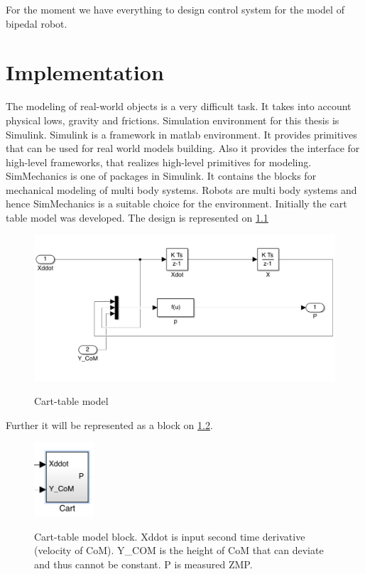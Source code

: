 \documentclass[12pt,a4paper]{report}
\begin{document}
			For the moment we have everything to design control system for the model of bipedal robot.
	\chapter{Implementation}
		The modeling of real-world objects is a very difficult task. It takes into account physical lows, gravity and frictions. Simulation environment for this thesis is Simulink.  Simulink is a framework in matlab environment. It provides primitives that can be used for real world models building. Also it provides the interface for high-level frameworks, that realizes high-level primitives for modeling. SimMechanics is one of packages in Simulink. It contains the blocks for mechanical modeling of multi body systems.  Robots are multi body systems and hence SimMechanics is a suitable choice for the environment.  
		Initially the cart table model was developed. The design is represented on \cref{fig:13}
		\begin{figure}[H]
			\vspace{-0.2cm}
			\centering
			{\includegraphics[width=1\textwidth]{13}}
			\caption{Cart-table model}
			\label{fig:13}
			\vspace{-0.1cm}
		\end{figure}
		
		Further it will be represented as a block on \cref{fig:14}.
		
		\begin{figure}[H]
			\vspace{-0.2cm}
			\centering
			{\includegraphics[width=0.2\textwidth]{14}}
			\caption{Cart-table model block. Xddot is input second time derivative (velocity of CoM). Y\_COM is the height of CoM that can deviate and thus cannot be constant. P is measured ZMP.}
			\label{fig:14}
			\vspace{-0.1cm}
		\end{figure}
		
\end{document}
